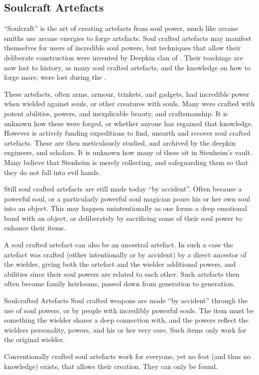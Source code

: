 \subsection{Soulcraft Artefacts}
\label{sec:Soulcraft Artefacts}

``Soulcraft'' is the art of creating artefacts from soul power, much like
arcane smiths use arcane energies to forge artefacts. Soul crafted artefacts
may manifest themselves for users of incredible soul powers, but techniques
that allow their deliberate construction were invented by Deepkin clan of
. Their teachings are now lost to history, as many soul
crafted artefacts, and the knowledge on how to forge more, were lost during
the .

These artefacts, often arms, armour, trinkets, and gadgets, had incredible
power when wielded against souls, or other creatures with souls. Many were
crafted with potent abilities, powers, and inexplicable beauty, and
craftsmanship. It is unknown how these were forged, or whether anyone has
regained that knowledge. However  is actively funding
expeditions to find, unearth and recover soul crafted artefacts. These are
then meticulously studied, and archived by the deepkin engineers, and
scholars. It is unknown how many of these sit in Stenheim's vault. Many
believe that Stenheim is merely collecting, and safeguarding them so that
they do not fall into evil hands.

Still soul crafted artefacts are still made today ``by accident''. Often
because a powerful soul, or a particularly powerful soul magician pours
his or her own soul into an object. This may happen unintentionally as one
forms a deep emotional bond with an object, or deliberately by sacrificing
some of their soul power to enhance their items.


A soul crafted artefact can also be an ancestral artefact. In such a case the
artefact was crafted (either intentionally or by accident) by a direct
ancestor of the wielder, giving both the artefact and the wielder additional
powers, and abilities since their soul powers are related to each other. Such
artefacts then often become family heirlooms, passed down from generation to
generation.

\begin{35e}{Soulcrafted Artefacts}
  Soul crafted weapons are made ``by accident'' through the use of soul powers,
  or by people with incredibly powerful souls. The item must be something the
  wielder shares a deep connection with, and the powers reflect the wielders
  personality, powers, and his or her very core. Such items only work for the
  original wielder.

  Conventionally crafted soul artefacts work for everyone, yet no feat (and
  thus no knowledge) exists, that allows their creation. They can only be
  found.
\end{35e}

